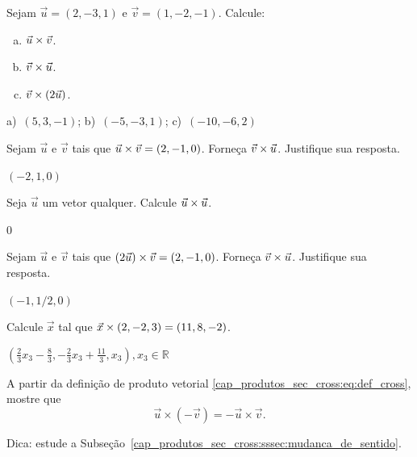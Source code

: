 \begin{exer}
  Sejam $\vec{u}=(2,-3,1)$ e $\vec{v}=(1,-2,-1)$. Calcule:
  \begin{enumerate}[a)]
  \item $\vec{u}\times\vec{v}$.
  \item $\vec{v}\times\vec{u}$.
  \item $\vec{v}\times(2\vec{u})$.
  \end{enumerate}
\end{exer}
\begin{resp}
  a)~$(5,3,-1)$; b)~$(-5,-3,1)$; c)~$(-10,-6,2)$
\end{resp}

\begin{exer}
  Sejam $\vec{u}$ e $\vec{v}$ tais que $\vec{u}\times\vec{v}=(2,-1,0)$. Forneça $\vec{v}\times\vec{u}$. Justifique sua resposta.
\end{exer}
\begin{resp}
  $(-2,1,0)$
\end{resp}

\begin{exer}
  Seja $\vec{u}$ um vetor qualquer. Calcule $\vec{u}\times\vec{u}$.
\end{exer}
\begin{resp}
  $0$
\end{resp}

\begin{exer}
  Sejam $\vec{u}$ e $\vec{v}$ tais que $(2\vec{u})\times\vec{v}=(2,-1,0)$. Forneça $\vec{v}\times\vec{u}$. Justifique sua resposta.
\end{exer}
\begin{resp}
  $(-1,1/2,0)$
\end{resp}

\begin{exer}
  Calcule $\vec{x}$ tal que $\vec{x}\times (2,-2,3)=(11,8,-2)$.
\end{exer}
\begin{resp}
  $\left(\frac{2}{3}x_3-\frac{8}{3},-\frac{2}{3}x_3+\frac{11}{3},x_3\right), x_3\in\mathbb{R}$
\end{resp}

\begin{exer}\label{cap_produtos_sec_cross:exer:mudanca_de_sentido}
  A partir da definição de produto vetorial \eqref{cap_produtos_sec_cross:eq:def_cross}, mostre que
  \begin{equation}
    \vec{u}\times(-\vec{v}) = -\vec{u}\times\vec{v}.
  \end{equation}
\end{exer}
\begin{resp}
  Dica: estude a Subseção~\ref{cap_produtos_sec_cross:sssec:mudanca_de_sentido}.
\end{resp}

